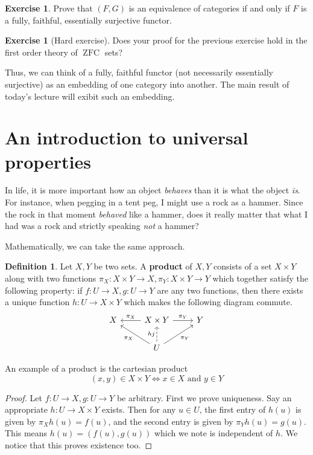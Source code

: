 \documentclass[12pt]{article}
\theoremstyle{plain}
\theoremstyle{definition}
\newtheorem{defn}[thm]{Definition} %
\newtheorem{exercise}[thm]{Exercise}
\newcommand{\lto}{\longrightarrow}
\begin{document}
\begin{exercise}
	Prove that $(F,G)$ is an equivalence of categories if and only if $F$ is a fully, faithful, essentially surjective functor.
	\end{exercise}

\begin{exercise}[Hard exercise]
	Does your proof for the previous exercise hold in the first order theory of $\operatorname{ZFC}$ sets?
	\end{exercise}

Thus, we can think of a fully, faithful functor (not necessarily essentially surjective) as an embedding of one category into another. The main result of today's lecture will exibit such an embedding.

\section{An introduction to universal properties}

In life, it is more important how an object \emph{behaves} than it is what the object \emph{is}. For instance, when pegging in a tent peg, I might use a rock as a hammer. Since the rock in that moment \emph{behaved} like a hammer, does it really matter that what I had was a rock and strictly speaking \emph{not} a hammer?

Mathematically, we can take the same approach.

\begin{defn}\label{def:product_set}
	Let $X, Y$ be two sets. A \textbf{product} of $X,Y$ consists of a set $X \times Y$ along with two functions $\pi_X: X \times Y \lto X, \pi_Y: X \times Y \lto Y$ which together satisfy the following property: if $f: U \lto X, g: U \lto Y$ are any two functions, then there exists a unique function $h: U \lto X \times Y$ which makes the following diagram commute.
	\begin{equation}
		\begin{tikzcd}
		X & X \times Y\arrow[l,swap,"{\pi_X}"]\arrow[r,"{\pi_Y}"] & Y\\
		& U\arrow[ul,"{\pi_X}"]\arrow[ur,swap,"{\pi_Y}"]\arrow[u,dashed,"{hj}"]
		\end{tikzcd}
		\end{equation}
	\end{defn}
An example of a product is the cartesian product
\begin{equation}
	(x,y) \in X \times Y \Leftrightarrow x \in X\text{ and }y \in Y
	\end{equation}
\begin{proof}
	Let $f: U \lto X, g: U \lto Y$ be arbitrary. First we prove uniqueness. Say an appropriate $h: U \lto X \times Y$ exists. Then for any $u \in U$, the first entry of $h(u)$ is given by $\pi_X h(u) = f(u)$, and the second entry is given by $\pi_Y h(u) = g(u)$. This means $h(u) = (f(u), g(u))$ which we note is independent of $h$. We notice that this proves existence too.
	\end{proof}
\end{document}
